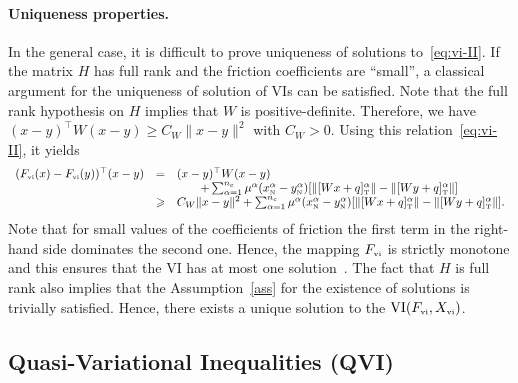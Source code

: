 {\paragraph{{Uniqueness} properties.} 
In the general case, it is difficult to prove uniqueness of solutions to~\eqref{eq:vi-II}.
If the matrix $H$ has full rank and the friction coefficients are ``small'', a classical argument for the uniqueness of solution of VIs can be satisfied.
Note that the full rank hypothesis on $H$ implies that $W$ is positive-definite. Therefore, we have  $(x-y)^\top W (x-y) \geq C_W \|x-y\|^2$ with  $C_W>0$.
Using this relation~\eqref{eq:vi-II}, it yields
\begin{equation}
  \label{eq:mono-II}
  \begin{array}{rcl}
    (F_{\vitwo}(x)-F_{\vitwo}(y))^\top(x-y) &=& (x-y)^\top W (x-y)  \\
    &  & \quad\quad + \sum _{\alpha =1}^{n_c} \mu^\alpha (x^\alpha_\n-y^\alpha_\n) [\|[Wx+q]^\alpha_\t \| - \|[Wy+q]^\alpha_\t \|] \\
    & \geq & C_W \|x-y\|^2  + \sum _{\alpha =1}^{n_c} \mu^\alpha (x^\alpha_\n-y^\alpha_\n) [\|[Wx+q]^\alpha_\t \| - \|[Wy+q]^\alpha_\t \|].
  \end{array}
\end{equation}
Note that for small values of the coefficients of friction the first term in the right-hand side dominates the second one.
Hence, the mapping $F_{\hbox{\tiny{vi}}}$ is strictly monotone and this ensures that the VI has at most one solution~\citep[Theorem 2.3.3]{Facchinei.Pang2003}. The fact that $H$ is full rank also implies that the Assumption~\eqref{ass} for the existence of solutions is trivially satisfied. {Hence,} there exists a unique solution to the $\mathrm{VI}(F_{{\hbox{\tiny{vi}}}},X_{{\hbox{\tiny{vi}}}})$.


\subsection{Quasi-Variational Inequalities (QVI)}

}
